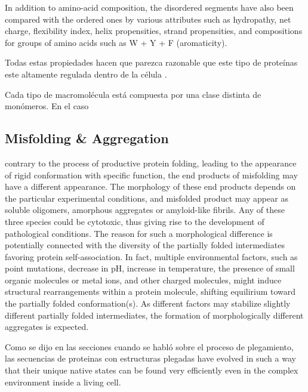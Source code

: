 In addition to amino-acid composition, the disordered segments have also been compared with the ordered ones by various attributes such as hydropathy, net charge, flexibility index, helix
propensities, strand propensities, and compositions for groups of amino acids such as W + Y + F (aromaticity).










Todas estas propiedades hacen que parezca razonable que este tipo de proteínas este altamente regulada dentro de la célula \cite{gsponer2008tight}.



Cada tipo de macromolécula está compuesta por una clase distinta de monómeros. En el caso

\subsection{Misfolding \& Aggregation}


contrary to the process of productive protein folding, leading to the appearance of rigid conformation with specific function, the end products of misfolding may have a different appearance. 
The morphology of these end products depends on the particular experimental conditions, and misfolded product may appear as soluble oligomers, amorphous aggregates or amyloid-like fibrils. 
Any of these three species could be cytotoxic, thus giving rise to the development of pathological conditions. 
The reason for such a morphological difference is potentially connected with the diversity of the partially folded intermediates favoring protein self-association. 
In fact, multiple environmental factors, such as point mutations, decrease in pH, increase in temperature, the presence of small organic molecules or metal ions, and other charged molecules, might induce structural rearrangements within a protein molecule, shifting equilirium toward the partially folded conformation(s). As different factors may stabilize slightly different partially folded intermediates, the formation of morphologically
different aggregates is expected.


Como se dijo en las secciones cuando se habló sobre el proceso de plegamiento, las secuencias de proteinas con estructuras plegadas have evolved in such a way that their unique native states 
can be found very efficiently even in the complex environment inside a living cell.


